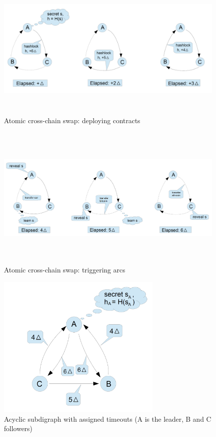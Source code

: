 \begin{figure}[h]
	\includegraphics[height=7cm]{deploying_contracts}	%
	\caption{Atomic cross-chain swap: deploying contracts}
	\label{fig:deploying_contracts}
\end{figure}

\begin{figure}[h]
	\includegraphics[height=7cm]{triggering_arcs}	%
	\caption{Atomic cross-chain swap: triggering arcs}
	\label{fig:triggering_arcs}
\end{figure}

\begin{figure}[h]
	\includegraphics[height=7cm]{acyclic_timeouts}	%
	\caption{Acyclic subdigraph with assigned timeouts (A is the leader, B and C followers)}
	\label{fig:acyclic_timeouts}
\end{figure}


